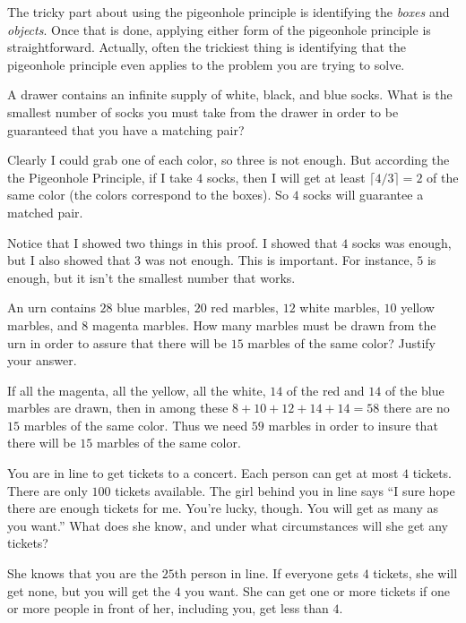 The tricky part about using the pigeonhole principle is identifying 
the {\em boxes} and {\em objects}.  Once that is done, 
applying either form of the pigeonhole principle is straightforward.
Actually, often the trickiest thing is identifying that the pigeonhole
principle even applies to the problem you are trying to solve.

\begin{exa}
A drawer contains an infinite supply of white, black, and blue socks.
What is the smallest number of socks you must take from the drawer in 
order to be guaranteed that you have a matching pair?
\begin{sol}
Clearly I could grab one of each color, so three is not enough.
But according the the Pigeonhole Principle, if I take $4$ socks, then 
I will get at least $\lceil4/3\rceil=2$ of the same color
(the colors correspond to the boxes).  
So $4$ socks will guarantee a matched pair.

Notice that I showed two things in this proof.  I showed that $4$ socks
was enough, but I also showed that $3$ was not enough.  This is important.
For instance, $5$ is enough, but it isn't the smallest number that works.
\end{sol}
\end{exa}

\begin{exer}
An urn contains $28$ blue marbles, $20$ red marbles, $12$ white
marbles, $10$ yellow marbles, and $8$ magenta marbles. How many
marbles must be drawn from the urn in order to assure that there
will be $15$ marbles of the same color? Justify your answer.

\noindent
\answerlinethree
\begin{answer} 
If all
the magenta, all the yellow, all the white, $14$ of the red and $14$
of the blue marbles are drawn, then in among these $8 + 10 + 12 + 14
+ 14 = 58$ there are no $15$ marbles of the same color. Thus we need
$59$ marbles in order to insure that there will be $15$ marbles of
the same color.
\end{answer}
\end{exer}


\begin{exer}
You are in line to get tickets to a concert.
Each person can get at most $4$ tickets.
There are only $100$ tickets available. 
The girl behind you in line says 
``I sure hope there are enough tickets for me.  You're lucky, though.  You will
get as many as you want.''  What does she know, and under what circumstances will
she get any tickets?

\noindent
\answerlinethree
\begin{answer}
She knows that you are the $25$th person in line.  If everyone gets $4$ tickets,
she will get none, but you will get the $4$ you want.  She can get one or more
tickets if one or more people in front of her, including you, get less than $4$.
\end{answer}
\end{exer}

